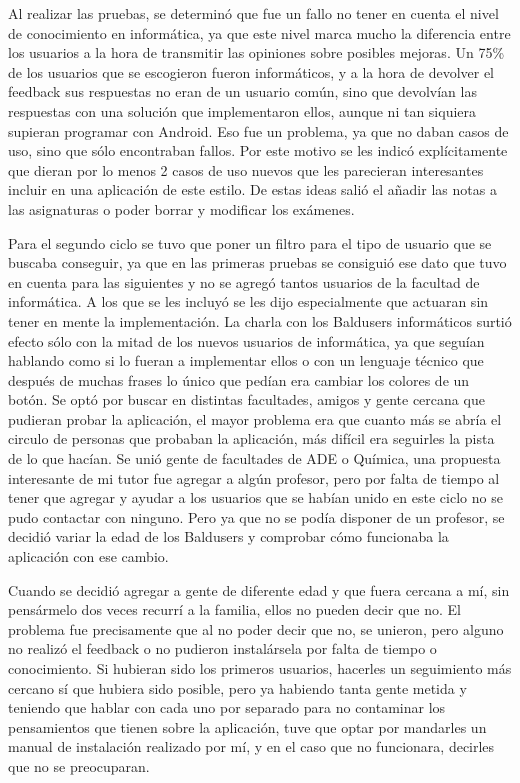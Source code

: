 Al realizar las pruebas, se determinó que fue un fallo no tener en cuenta el nivel de conocimiento en informática, ya que  este nivel marca mucho la diferencia entre los usuarios a la hora de transmitir las opiniones sobre posibles mejoras.
Un 75\% de los usuarios que se escogieron fueron informáticos, y a la hora de devolver el feedback sus respuestas no eran de un usuario común, sino que devolvían las respuestas con una solución que implementaron ellos, aunque ni tan siquiera supieran programar con Android.
Eso fue un problema, ya que no daban casos de uso, sino que sólo encontraban fallos. Por este motivo se les indicó explícitamente  que dieran por lo menos 2 casos de uso nuevos que les parecieran interesantes incluir en una aplicación de este estilo.
De estas ideas salió el añadir las notas a las asignaturas o poder borrar y modificar los exámenes.

Para el segundo ciclo se tuvo que poner un filtro para el tipo de usuario que se buscaba conseguir, ya que en las primeras pruebas se consiguió ese dato que tuvo en cuenta para las siguientes y no se agregó tantos usuarios de la facultad de informática. A los que se les incluyó se les dijo especialmente que actuaran sin tener en mente la implementación.
La charla con los Baldusers informáticos surtió efecto sólo con la mitad de los nuevos usuarios de informática, ya que seguían hablando como si lo fueran a implementar ellos o con un lenguaje técnico que después de muchas frases lo único que pedían era cambiar los colores de un botón. 
Se optó por buscar en distintas facultades, amigos y gente cercana que pudieran probar la aplicación, el mayor problema era que cuanto más se abría el circulo de personas que probaban la aplicación, más difícil era seguirles la pista de lo que hacían. 
Se unió gente de facultades de ADE o Química, una propuesta interesante de mi tutor fue agregar a algún profesor, pero por falta de tiempo al tener que agregar y ayudar a los usuarios que se habían unido en este ciclo no se pudo contactar con ninguno.
Pero ya que no se podía disponer de un profesor, se decidió variar la edad de los Baldusers y comprobar cómo funcionaba la aplicación con ese cambio.

Cuando se decidió agregar a gente de diferente edad y que fuera cercana a mí, sin pensármelo dos veces recurrí a la familia, ellos no pueden decir que no.
El problema fue precisamente que al no poder decir que no, se unieron,  pero alguno no realizó el feedback o no pudieron instalársela por falta de tiempo o conocimiento.
Si hubieran sido los primeros usuarios, hacerles un seguimiento más cercano sí que hubiera sido posible, pero ya habiendo tanta gente metida y teniendo que hablar con cada uno por separado para no contaminar los pensamientos que tienen sobre la aplicación, tuve que optar por mandarles un manual de instalación realizado por mí, y en el caso que no funcionara, decirles que no se preocuparan.

